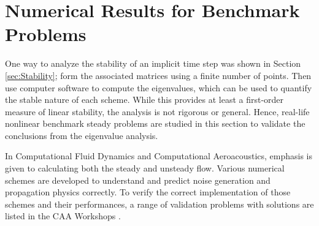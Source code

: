 \documentclass[conf]{new-aiaa}
\begin{document}
\section{Numerical Results for Benchmark
Problems}
One way to analyze the stability of an implicit time step was shown in Section \ref{sec:Stability}; 
form the associated matrices using a finite number of points. Then use computer software to compute the eigenvalues, which can be used to quantify the stable nature of each scheme. 
While this provides at least a first-order measure of linear stability, the analysis is not rigorous or general. 
Hence, real-life nonlinear benchmark steady problems are studied in this section to validate the conclusions from the eigenvalue analysis. 

In Computational Fluid Dynamics and Computational Aeroacoustics, emphasis is given to calculating both the steady and unsteady flow. 
Various numerical schemes are developed to understand and predict noise generation and propagation physics correctly. 
To verify the correct implementation of those schemes and their performances, a range of validation problems with solutions are listed in the CAA Workshops \cite{CAA1, CAA2, CAA3}.
\end{document}
